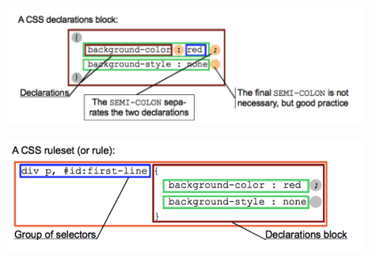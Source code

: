\documentclass{article}
\begin{document}
\includegraphics[width=0.9\textwidth]{img/Screenshot_20200212_151542.png}

\includegraphics[width=0.9\textwidth]{img/Screenshot_20200212_151616.png}
\end{document}
